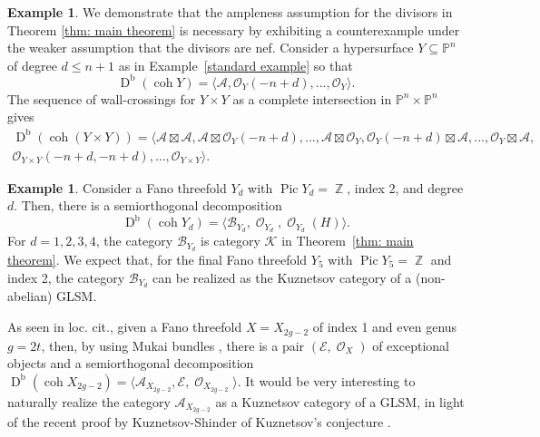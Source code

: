 \documentclass[reqno, 12pt]{amsart}
\theoremstyle{definition}
\newtheorem{example}[theorem]{Example}
\newcommand{\op}[1]{\operatorname{#1}}
\newcommand{\dbcoh}[1]{\operatorname{D}^{\operatorname{b}}(\operatorname{coh }#1)}
\def\Z{\op{\mathbb{Z}}}
\def\O{\op{\mathcal{O}}}
\numberwithin{equation}{section}
\begin{document}
\begin{example}
We demonstrate that the ampleness assumption for the divisors in Theorem \ref{thm: main theorem} is necessary by exhibiting a counterexample under the weaker assumption that the divisors are nef.   
Consider a hypersurface $Y \subseteq \mathbb P^n$ of degree $d\leq n+1$ as in Example~\ref{standard example} so that
\[
\dbcoh{Y} = \langle \mathcal A, \mathcal O_Y(-n+d), ..., \mathcal O_Y \rangle.
\]
The sequence of wall-crossings for $Y \times Y$ as a complete intersection in $\mathbb P^n \times \mathbb P^n$ gives
\begin{align*} \dbcoh{(Y \times Y)} = \langle 
\mathcal A \boxtimes \mathcal A, \mathcal A\boxtimes \mathcal O_Y(-n+d), ..., \mathcal A \boxtimes \mathcal O_Y, \mathcal O_Y(-n+d) \boxtimes \mathcal A, ..., \mathcal O_Y \boxtimes \mathcal A , \\
\mathcal O_{Y \times Y}(-n+d,-n+d), ..., \mathcal O_{Y \times Y} \rangle.
\end{align*}
\end{example}

\begin{example}
Consider a Fano threefold $Y_d$ with $\op{Pic} Y_d = \Z$, index 2, and degree $d$. Then,   there is a semiorthogonal decomposition \cite[Corollary 3.5]{Kuz09}
\[
\dbcoh{Y_d} = \langle \mathcal{B}_{Y_d}, \O_{Y_d}, \O_{Y_d}(H)\rangle.
\]
For $d =1,2, 3, 4$, the category $\mathcal{B}_{Y_d}$ is category $\mathcal K$ in Theorem~\ref{thm: main theorem}. We expect that, for the final Fano threefold $Y_5$ with $\op{Pic} Y_5 = \Z$ and index 2, the category $\mathcal{B}_{Y_d}$ can be realized as the Kuznetsov category of a (non-abelian) GLSM.

As seen in loc. cit., given a Fano threefold $X = X_{2g-2}$ of index 1 and even genus $g = 2t$, then, by using Mukai bundles \cite{Mukai, Kuz09, BKM}, there is a pair $(\mathcal{E}, \O_X)$ of exceptional objects and a semiorthogonal decomposition
$\dbcoh{X_{2g-2}} = \langle \mathcal{A}_{X_{2g-2}}, \mathcal E, \O_{X_{2g-2}}\rangle$. It would be very interesting to naturally realize the category $\mathcal{A}_{X_{2g-2}}$ as a Kuznetsov category of a GLSM, in light of the recent proof by Kuznetsov-Shinder of Kuznetsov's conjecture \cite{KuzShin}.
\end{example}
\end{document}
